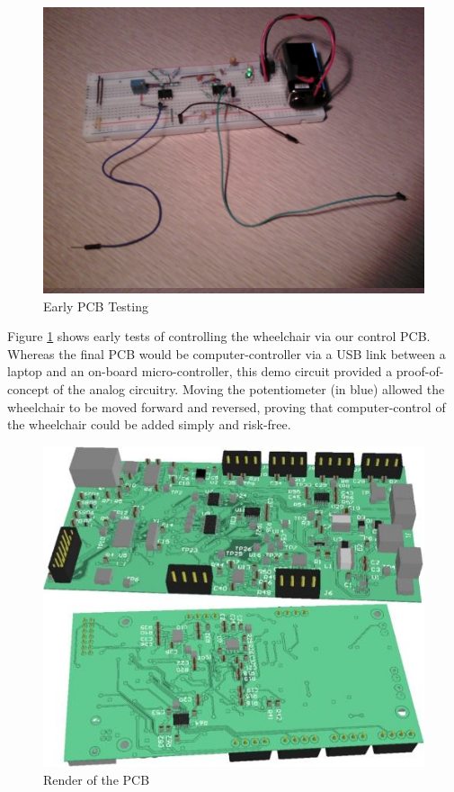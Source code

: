 \documentclass[oneside,final,a4paper]{report}
\begin{document}
\begin{figure}[hbt]
 \centering
 \includegraphics[scale=0.35]{test_circuit}
 \caption{Early PCB Testing}
 \label{fig:testing_PCB}
\end{figure}

Figure \ref{fig:testing_PCB} shows early tests of controlling the wheelchair via our control PCB. Whereas the final PCB would be computer-controller via a USB link between a laptop and an on-board micro-controller, this demo circuit provided a proof-of-concept of the analog circuitry. Moving the potentiometer (in blue) allowed the wheelchair to be moved forward and reversed, proving that computer-control of the wheelchair could be added simply and risk-free.

\begin{figure}[hbt]
 \centering
 \includegraphics[scale=0.35]{PCB_Render}
 \caption{Render of the PCB}
 \label{fig:PCB_Render}
\end{figure}
\end{document}
